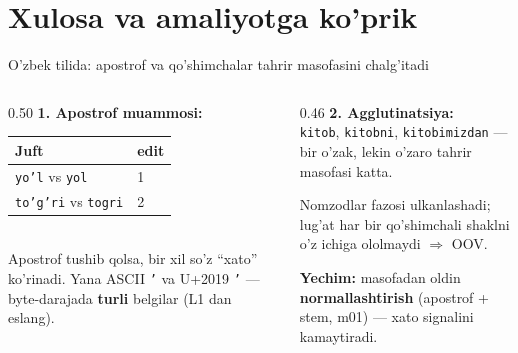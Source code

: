 \documentclass[aspectratio=169,11pt]{beamer}
\begin{document}
\section[Xulosa]{Xulosa va amaliyotga ko'prik}

\begin{frame}{O'zbek tilida: apostrof va qo'shimchalar tahrir masofasini chalg'itadi}
  \begin{columns}[T]
    \begin{column}{0.50\textwidth}
      \textbf{1. Apostrof muammosi:}\\[3pt]
      \small
      \begin{tabular}{ll}
        \toprule
        Juft & edit \\
        \midrule
        \texttt{yo'l} vs \texttt{yol}     & 1 \\
        \texttt{to'g'ri} vs \texttt{togri} & 2 \\
        \bottomrule
      \end{tabular}\\[4pt]
      \footnotesize
      Apostrof tushib qolsa, bir xil so'z ``xato'' ko'rinadi.
      Yana ASCII \texttt{'} va U+2019 \texttt{'} --- byte-darajada
      \textbf{turli} belgilar (L1 dan eslang).
    \end{column}
    \begin{column}{0.46\textwidth}
      \textbf{2. Agglutinatsiya:}\\[3pt]
      \small
      \texttt{kitob}, \texttt{kitobni}, \texttt{kitobimizdan} ---
      bir o'zak, lekin o'zaro tahrir masofasi katta.\\[4pt]
      \begin{tcolorbox}[warnbox,title=Oqibat,top=2pt,bottom=2pt]
        \footnotesize
        Nomzodlar fazosi ulkanlashadi; lug'at har bir qo'shimchali
        shaklni o'z ichiga ololmaydi $\Rightarrow$ OOV.
      \end{tcolorbox}
      \vspace{2pt}
      \footnotesize\textbf{Yechim:} masofadan oldin \textbf{normallashtirish}
      (apostrof + stem, m01) --- xato signalini kamaytiradi.
    \end{column}
  \end{columns}
\end{frame}
\end{document}
